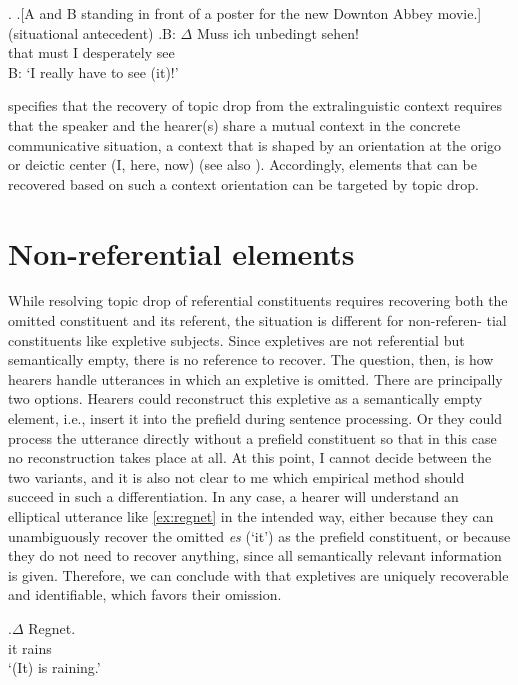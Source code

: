 \ex.\label{ex:recoverable.context.2}
\a.\label{ex:recoverable.context.sit}[A and B standing in front of a poster for the new Downton Abbey movie.]\hfill(situational antecedent)
\bg.\label{ex:recoverable.target.2}B: $\Delta$ Muss ich unbedingt sehen!\\
{} that must I desperately  see\\
B: `I really have to see (it)!'

\citet[73]{frick2017} specifies that the recovery of topic drop from the extralinguistic context requires that the speaker and the hearer(s) share a mutual context in the concrete communicative situation, a context that is shaped by an orientation at the origo or deictic center (I, here, now) \citep[102]{buhler1965} (see also ).
Accordingly, elements that can be recovered based on such a context orientation can be targeted by topic drop.

\section{Non-referential elements}\label{sec:recover.non.referential} 
While resolving topic drop of referential constituents requires recovering both the omitted constituent and its referent, the situation is different for non-referen- tial constituents like expletive subjects.
Since expletives are not referential but semantically empty, there is no reference to recover.
The question, then, is how hearers handle utterances in which an expletive is omitted.
There are principally two options.
Hearers could reconstruct this expletive as a semantically empty element, i.e., insert it into the prefield during sentence processing.
Or they could process the utterance directly without a prefield constituent so that in this case no reconstruction takes place at all.
At this point, I cannot decide between the two variants, and it is also not clear to me which empirical method should succeed in such a differentiation.
In any case, a hearer will understand an elliptical utterance like \ref{ex:regnet} in the intended way, either because they can unambiguously recover the omitted \textit{es} (`it') as the prefield constituent, or because they do not need to recover anything, since all semantically relevant information is given.
Therefore, we can conclude with \citet[137]{frick2017} that expletives are uniquely recoverable and identifiable, which favors their omission.

\exg.\label{ex:regnet}$\Delta$ Regnet.\\
it rains\\
`(It) is raining.'

